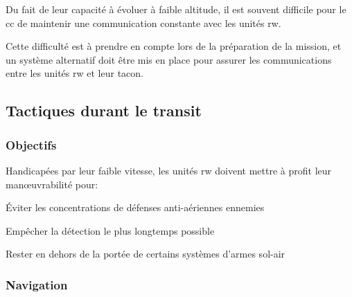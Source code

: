 \begin{e1}
	\item
	Du fait de leur capacité à évoluer à faible altitude, il est souvent difficile pour le \gls{cc} de maintenir une communication constante avec les unités \gls{rw}.
	\item
	Cette difficulté est à prendre en compte lors de la préparation de la mission,  et un système alternatif doit être mis en place pour assurer les communications entre les unités \gls{rw} et leur \gls{tacon}.
\end{e1}

\subsection{Tactiques durant le transit}

\subsubsection{Objectifs}

\begin{e1}
	\item Handicapées par leur faible vitesse, les unités \gls{rw} doivent mettre à profit leur manœuvrabilité pour:
	\begin{e2}
		\item Éviter les concentrations de défenses anti-aériennes ennemies
		\item Empêcher la détection le plus longtemps possible
		\item Rester en dehors de la portée de certains systèmes d'armes sol-air
	\end{e2}
\end{e1}

\subsubsection{Navigation}

